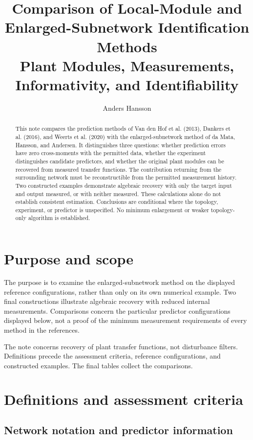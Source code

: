 \documentclass[11pt,a4paper]{article}
\title{Comparison of Local-Module and Enlarged-Subnetwork Identification Methods\\
\large Plant Modules, Measurements, Informativity, and Identifiability}
\author{Anders Hansson}
\date{}
\begin{document}
\maketitle

\begin{abstract}
This note compares the prediction methods of Van den Hof et al. (2013), Dankers et al. (2016), and Weerts et al. (2020) with the enlarged-subnetwork method of da Mata, Hansson, and Andersen.  It distinguishes three questions: whether prediction errors have zero cross-moments with the permitted data, whether the experiment distinguishes candidate predictors, and whether the original plant modules can be recovered from measured transfer functions.  The contribution returning from the surrounding network must be reconstructible from the permitted measurement history.  Two constructed examples demonstrate algebraic recovery with only the target input and output measured, or with neither measured.  These calculations alone do not establish consistent estimation.  Conclusions are conditional where the topology, experiment, or predictor is unspecified.  No minimum enlargement or weaker topology-only algorithm is established.
\end{abstract}

\section{Purpose and scope}

The purpose is to examine the enlarged-subnetwork method on the displayed reference configurations, rather than only on its own numerical example.  Two final constructions illustrate algebraic recovery with reduced internal measurements.  Comparisons concern the particular predictor configurations displayed below, not a proof of the minimum measurement requirements of every method in the references.

The note concerns recovery of plant transfer functions, not disturbance filters.  Definitions precede the assessment criteria, reference configurations, and constructed examples.  The final tables collect the comparisons.

\section{Definitions and assessment criteria}
\label{sec:framework}

\subsection{Network notation and predictor information}
\label{sec:notation}
\end{document}
